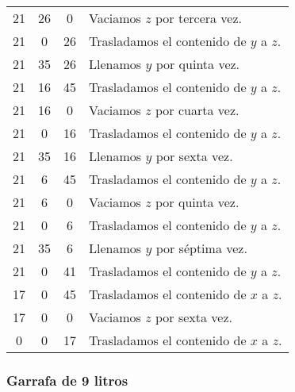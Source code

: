 \begin{center}
\begin{tabular}{c c c l}
	21                    & 26                    & 0                     & Vaciamos $z$ por tercera vez.          \\
	21                    & 0                     & 26                    & Trasladamos el contenido de $y$ a $z$. \\
	21                    & 35                    & 26                    & Llenamos $y$ por quinta vez.           \\
	21                    & 16                    & 45                    & Trasladamos el contenido de $y$ a $z$. \\
	21                    & 16                    & 0                     & Vaciamos $z$ por cuarta vez.           \\
	21                    & 0                     & 16                    & Trasladamos el contenido de $y$ a $z$. \\
	21                    & 35                    & 16                    & Llenamos $y$ por sexta vez.            \\
	21                    & 6                     & 45                    & Trasladamos el contenido de $y$ a $z$. \\
	21                    & 6                     & 0                     & Vaciamos $z$ por quinta vez.           \\
	21                    & 0                     & 6                     & Trasladamos el contenido de $y$ a $z$. \\
	21                    & 35                    & 6                     & Llenamos $y$ por séptima vez.          \\
	21                    & 0                     & 41                    & Trasladamos el contenido de $y$ a $z$. \\
	17                    & 0                     & 45                    & Trasladamos el contenido de $x$ a $z$. \\
	17                    & 0                     & 0                     & Vaciamos $z$ por sexta vez.            \\
	0                     & 0                     & 17                    & Trasladamos el contenido de $x$ a $z$.
\end{tabular}
\end{center}

\pagebreak

\subsubsection*{Garrafa de 9 litros}

